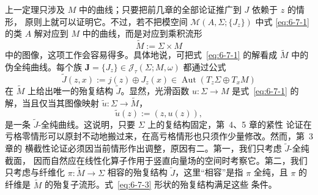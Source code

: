 上一定理只涉及 $M$ 中的曲线；只要把前几章的全部论证推广到 $J$ 依赖于 $z$ 的情形，
原则上就可以证明它。不过，若不把模空间 $\mathcal M(A,\Sigma;\{J_z\})$ 中式
\eqref{eq:6-7-1} 的类 $A$ 解对应到 $M$ 中的曲线，而是对应到乘积流形
\[
  \widetilde M:=\Sigma\times M
\]
中的图像，这项工作会容易得多。具体地说，可把式~\eqref{eq:6-7-1} 的解看成
$\widetilde M$ 中的伪全纯曲线。每个族
$\mathbf J=\{J_z\}\in\mathcal J_\tau(\Sigma;M,\omega)$ 都通过公式
\begin{equation}\label{eq:6-7-3}
  \widetilde J(z,x):=j(z)\oplus J_z(x)
  \in\operatorname{Aut}(T_z\Sigma\oplus T_xM)
\end{equation}
在 $\widetilde M$ 上给出唯一的殆复结构 $\widetilde J$。显然，光滑函数
$u:\Sigma\to M$ 是式~\eqref{eq:6-7-1} 的解，当且仅当其图像映射
$\widetilde u:\Sigma\to\widetilde M$，
\[
  \widetilde u(z):=(z,u(z)),
\]
是一条 $\widetilde J$-全纯曲线。这说明，只要 $\Sigma$ 上的复结构固定，第~4、5 章的紧性
论证在亏格零情形可以原封不动地搬过来，在高亏格情形也只须作少量修改。然而，第~3 章的
横截性论证必须因当前情形作出调整，原因有二。第一，我们只考虑 $\widetilde J$-全纯截面，
因而自然应在线性化算子作用于竖直向量场的空间时考察它。第二，我们只考虑与纤维化
$\pi:\widetilde M\to\Sigma$ 相容的殆复结构 $\widetilde J$，这里“相容”是指 $\pi$ 全纯，且
$\pi$ 的纤维是 $\widetilde M$ 的殆复子流形。式~\eqref{eq:6-7-3} 形状的殆复结构满足这些
条件。

